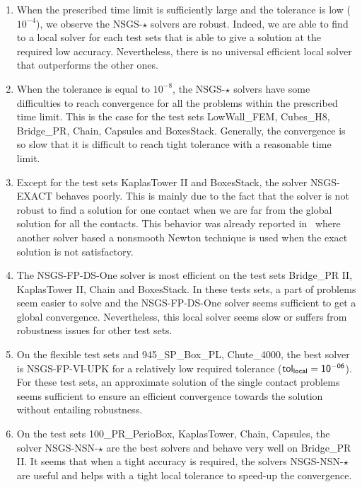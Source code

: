 \begin{enumerate}
\item When the prescribed time limit is sufficiently large and the tolerance is low ($10^{-4}$), we observe the {\sf NSGS-$\star$} solvers are robust. Indeed, we are able to find to a local solver for each test sets that is able to give a solution at the required low accuracy. Nevertheless, there is no universal efficient local solver that outperforms the other ones.
  
\item When the tolerance is equal to $10^{-8}$,  the {\sf NSGS-$\star$} solvers have some difficulties to reach convergence for all the problems within the prescribed time limit. This is the case for the test sets LowWall\_FEM, Cubes\_H8, Bridge\_PR, Chain,  Capsules and BoxesStack. Generally, the convergence is so slow that it is difficult to reach tight tolerance with a reasonable time limit.
 
\item Except for the test sets KaplasTower II and BoxesStack, the solver {\sf NSGS-EXACT} behaves poorly. This is mainly due to the fact that the solver is not robust to find a solution for one contact when we are far from the global solution for all the contacts. This behavior was already reported in~\citep{Daviet.ea_SIGGRAPH2011} where another solver based a nonsmooth Newton technique is used when  the exact solution is not satisfactory.
  
\item  The {\sf NSGS-FP-DS-One} solver  is most efficient on the test sets Bridge\_PR II, KaplasTower II, Chain and BoxesStack. In these tests sets, a part of problems seem easier to solve and the {\sf NSGS-FP-DS-One} solver seems sufficient to get a global convergence.
  Nevertheless, this local solver seems slow or suffers from robustness issues for other test sets.
  
\item On the flexible test sets and 945\_SP\_Box\_PL, Chute\_4000, the best solver is {\sf NSGS-FP-VI-UPK} for a relatively low required tolerance ($\sf tol_{local} =10^{-06}$). For these test sets, an approximate solution of the single contact problems seems sufficient to ensure an efficient convergence towards the solution without entailing robustness.
  
\item On the test sets 100\_PR\_PerioBox, KaplasTower,  Chain, Capsules, the solver {\sf NSGS-NSN-$\star$} are the best solvers and behave very well on Bridge\_PR II. It seems that when a tight accuracy is required, the solvers {\sf NSGS-NSN-$\star$} are useful and helps with a tight local tolerance to speed-up the convergence.
  

\end{enumerate}
